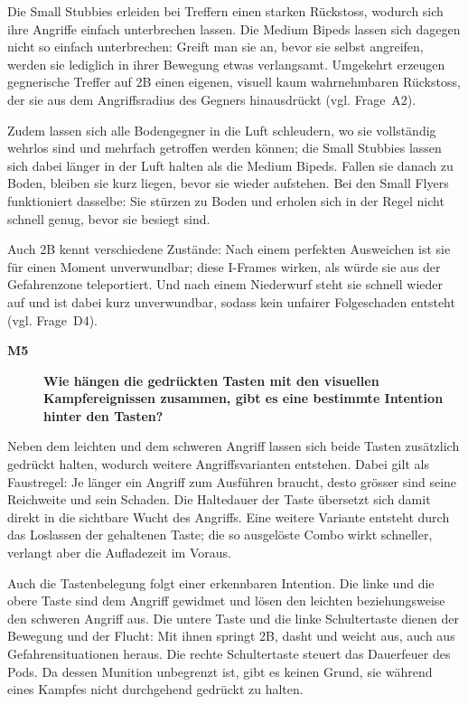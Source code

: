 \documentclass[../Main.tex]{subfiles}
\begin{document}
Die Small Stubbies erleiden bei Treffern einen starken Rückstoss, wodurch sich ihre Angriffe einfach unterbrechen lassen. Die Medium Bipeds lassen sich dagegen nicht so einfach unterbrechen: Greift man sie an, bevor sie selbst angreifen, werden sie lediglich in ihrer Bewegung etwas verlangsamt. Umgekehrt erzeugen gegnerische Treffer auf 2B einen eigenen, visuell kaum wahrnehmbaren Rückstoss, der sie aus dem Angriffsradius des Gegners hinausdrückt (vgl. Frage~A2).

Zudem lassen sich alle Bodengegner in die Luft schleudern, wo sie vollständig wehrlos sind und mehrfach getroffen werden können; die Small Stubbies lassen sich dabei länger in der Luft halten als die Medium Bipeds. Fallen sie danach zu Boden, bleiben sie kurz liegen, bevor sie wieder aufstehen. Bei den Small Flyers funktioniert dasselbe: Sie stürzen zu Boden und erholen sich in der Regel nicht schnell genug, bevor sie besiegt sind.

Auch 2B kennt verschiedene Zustände: Nach einem perfekten Ausweichen ist sie für einen Moment unverwundbar; diese I-Frames wirken, als würde sie aus der Gefahrenzone teleportiert. Und nach einem Niederwurf steht sie schnell wieder auf und ist dabei kurz unverwundbar, sodass kein unfairer Folgeschaden entsteht (vgl. Frage~D4).

\begin{description}
    \item[\textbf{M5}] \textbf{Wie hängen die gedrückten Tasten mit den visuellen Kampfereignissen zusammen, gibt es eine bestimmte Intention hinter den Tasten?}
\end{description}

\begingroup\color{red}Neben dem leichten und dem schweren Angriff lassen sich beide Tasten zusätzlich gedrückt halten, wodurch weitere Angriffsvarianten entstehen. Dabei gilt als Faustregel: Je länger ein Angriff zum Ausführen braucht, desto grösser sind seine Reichweite und sein Schaden. Die Haltedauer der Taste übersetzt sich damit direkt in die sichtbare Wucht des Angriffs. Eine weitere Variante entsteht durch das Loslassen der gehaltenen Taste; die so ausgelöste Combo wirkt schneller, verlangt aber die Aufladezeit im Voraus.

Auch die Tastenbelegung folgt einer erkennbaren Intention. Die linke und die obere Taste sind dem Angriff gewidmet und lösen den leichten beziehungsweise den schweren Angriff aus. Die untere Taste und die linke Schultertaste dienen der Bewegung und der Flucht: Mit ihnen springt 2B, dasht und weicht aus, auch aus Gefahrensituationen heraus. Die rechte Schultertaste steuert das Dauerfeuer des Pods. Da dessen Munition unbegrenzt ist, gibt es keinen Grund, sie während eines Kampfes nicht durchgehend gedrückt zu halten.\endgroup
\end{document}
